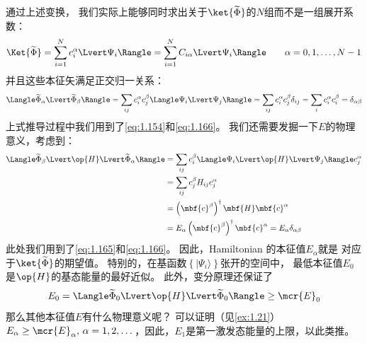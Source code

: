 通过上述变换，
我们实际上能够同时求出关于$\ket{\widetilde\Phi}$的$N$组而不是一组展开系数：
\begin{equation}
 \Ket{\widetilde\Phi} = \sum_{i=1}^N c_i^\alpha \Lvert\Psi_i\Rangle = \sum_{i=1}^N C_{i\alpha}\Lvert\Psi_i\Rangle \qquad \alpha = 0, 1, \dots, N-1
 \label{eq:1.168}
\end{equation}
并且这些本征矢满足正交归一关系：
\begin{equation}
 \Langle\widetilde\Phi_\alpha\Lvert\widetilde\Phi_\beta\Rangle = \sum_{ij} c_i^\alpha c_j^\beta \Langle\Psi_i\Lvert\Psi_j\Rangle = \sum_{ij}c_i^\alpha c_j^\beta\delta_{ij} = \sum_i c_i^\alpha c_i^\beta = \delta_{\alpha\beta}
 \label{eq:1.169}
\end{equation}
上式推导过程中我们用到了\autoref{eq:1.154}和\autoref{eq:1.166}。
我们还需要发掘一下$E$的物理意义，考虑到：
\begin{equation}
 \begin{split}
     \Langle\widetilde\Phi_\beta\Lvert\op{H}\Lvert\widetilde\Phi_\alpha\Rangle &= \sum_{ij} c_i^\beta \Langle \Psi_i\Lvert\op{H}\Lvert\Psi_j\Rangle c_j^\alpha \\
     &= \sum_{ij}c_j^\beta H_{ij}c_j^\alpha \\
     &= \left(\mbf{c}^\beta\right)^\dagger\mbf{H}\mbf{c}^\alpha \\
     &= E_\alpha \left(\mbf{c}^\beta\right)^\dagger\mbf{c}^\alpha = E_\alpha \delta_{\alpha\beta}
 \end{split}
 \label{eq:1.170}
\end{equation}
此处我们用到了\autoref{eq:1.165}和\autoref{eq:1.166}。
因此，Hamiltonian 的本征值$E_\alpha$就是 对应于$\ket{\widetilde\Phi}$的期望值。
特别的，在基函数$\left\{\vert\Psi_i\rangle\right\}$张开的空间中，
最低本征值$E_0$是$\op{H}$的基态能量的最好近似。
此外，变分原理还保证了
\begin{equation}
 E_0 = \Langle\widetilde\Phi_0\Lvert\op{H}\Lvert\widetilde\Phi_0\Rangle \geq \mcr{E}_0
 \label{eq:1.171}
\end{equation}
那么其他本征值$E$有什么物理意义呢？
可以证明（见\autoref{ex:1.21}）
$E_\alpha \geq \mcr{E}_\alpha,\, \alpha = 1, 2, \dots$，因此，$E_1$是第一激发态能量的上限，以此类推。

